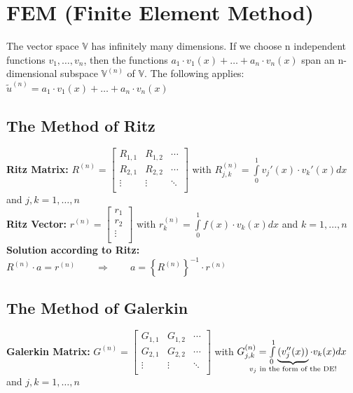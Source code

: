\clearpage


\section{FEM (Finite Element Method)}

The vector space $\mathbb{V}$ has infinitely many dimensions.
If we choose n independent functions $v_1,\ldots,v_n$,
then the functions $a_1\cdot v_1(x)+\ldots+a_n\cdot v_n(x)$
span an n-dimensional subspace $\mathbb{V}^{(n)}$ of $\mathbb{V}$.
The following applies:\\

$\boxed{\tilde{u}^{(n)}=a_1\cdot v_1(x)+\ldots+a_n\cdot v_n(x)}$
\subsection{The Method of Ritz}
\textbf{Ritz Matrix: }
$R^{(n)}=\begin{bmatrix}
	R_{1,1}& R_{1,2}&\cdots\\
	R_{2,1}& R_{2,2}&\cdots\\
	\vdots & \vdots &\ddots\\
\end{bmatrix}$ \quad with \quad $R_{j,k}^{(n)}=\int\limits_{0}^{1}{v_j'(x)\cdot v_k'(x) dx}$
\quad and \quad $j, k = 1,\ldots,n$\\

\textbf{Ritz Vector: }
$r^{(n)}=\begin{bmatrix}
	r_1\\
	r_2\\
	\vdots\\
\end{bmatrix}$ \quad with \quad $r_{k}^{(n)}=\int\limits_{0}^{1}{f(x)\cdot v_k(x) dx}$
\quad and \quad $k = 1,\ldots,n$\\

\textbf{Solution according to Ritz:}
$R^{(n)}\cdot a=r^{(n)}\qquad \Rightarrow \qquad a=\left\{R^{(n)}\right\}^{-1}\cdot r^{(n)}$


\subsection{The Method of Galerkin}
\textbf{Galerkin Matrix: }
$G^{(n)}=\begin{bmatrix}
	G_{1,1}& G_{1,2}&\cdots\\
	G_{2,1}& G_{2,2}&\cdots\\
	\vdots & \vdots &\ddots\\
\end{bmatrix}$ \quad with \quad $G_{j,k}^{(n)}=\int\limits_{0}^{1}{\underbrace{(v_j''(x))}_{\mathclap{v_j \text{ in the form of the DE!}}}\cdot v_k(x) dx}$
\quad and \quad $j, k = 1,\ldots,n$\\


